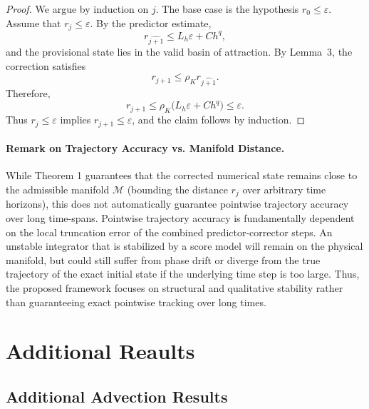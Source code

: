 \documentclass[letterpaper]{article} %
\begin{document}
\begin{proof}
We argue by induction on $j$. The base case is the hypothesis
$r_0\le\varepsilon$. Assume that $r_j\le\varepsilon$. By the predictor
estimate,
\[
r_{\widehat{j+1}}
\le L_h\varepsilon+Ch^q,
\]
and the provisional state lies in the valid basin of attraction.
By Lemma~3, the correction satisfies
\[
r_{j+1}
\le \rho_K r_{\widehat{j+1}}.
\]
Therefore,
\[
r_{j+1}
\le
\rho_K\bigl(L_h\varepsilon+Ch^q\bigr)
\le\varepsilon.
\]
Thus $r_j\le\varepsilon$ implies $r_{j+1}\le\varepsilon$, and the claim
follows by induction.
\end{proof}


\paragraph{Remark on Trajectory Accuracy vs. Manifold Distance.}
While Theorem 1 guarantees that the corrected numerical state remains close to the admissible manifold $\mathcal{M}$ (bounding the distance $r_j$ over arbitrary time horizons), this does not automatically guarantee pointwise trajectory accuracy over long time-spans. Pointwise trajectory accuracy is fundamentally dependent on the local truncation error of the combined predictor-corrector steps. An unstable integrator that is stabilized by a score model will remain on the physical manifold, but could still suffer from phase drift or diverge from the true trajectory of the exact initial state if the underlying time step is too large. Thus, the proposed framework focuses on structural and qualitative stability rather than guaranteeing exact pointwise tracking over long times.



\section{Additional Reaults}
\subsection{Additional Advection Results}
\label{app:additional_advection}
\end{document}
